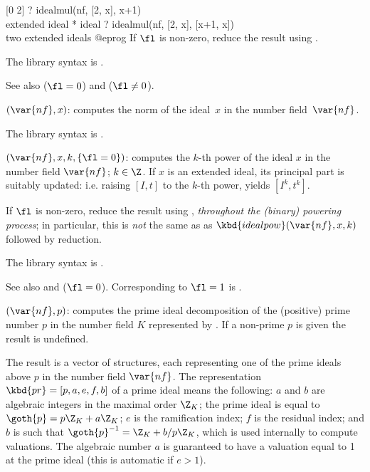 [0 2]
? idealmul(nf, [2, x], x+1)        \\ extended ideal * ideal
? idealmul(nf, [2, x], [x+1, x])   \\ two extended ideals
@eprog\noindent
If $\fl$ is non-zero, reduce the result using .

The library syntax is .

\noindent See also  ($\fl=0$) and 
($\fl\neq0$).

$(\var{nf},x)$: \label{se:idealnorm}computes the norm of the ideal~$x$ in the number field~$\var{nf}$.

The library syntax is .

$(\var{nf},x,k,\{\fl=0\})$: \label{se:idealpow}computes the $k$-th power of
the ideal $x$ in the number field $\var{nf}$; $k\in\Z$.
If $x$ is an extended
ideal, its principal part is suitably
updated: i.e. raising $[I,t]$ to the $k$-th power, yields $[I^k, t^k]$.

If $\fl$ is non-zero, reduce the result using , \emph{throughout
the (binary) powering process}; in particular, this is \emph{not} the same as
as $\kbd{idealpow}(\var{nf},x,k)$ followed by reduction.

The library syntax is .

\noindent See also
 and
 ($\fl = 0$).
Corresponding to $\fl=1$ is .

$(\var{nf},p)$: \label{se:idealprimedec}computes the prime ideal
decomposition of the (positive) prime number $p$ in the number field $K$
represented by . If a non-prime $p$ is given the result is undefined.

The result is a vector of  structures, each representing one of the
prime ideals above $p$ in the number field $\var{nf}$. The representation
$\kbd{pr}=[p,a,e,f,b]$ of a prime ideal means the following: $a$ and $b$ are
algebraic integers in the maximal order $\Z_K$; the prime ideal is
equal to $\goth{p} = p\Z_K + a\Z_K$;
$e$ is the ramification index; $f$ is the residual index;
and $b$ is such that $\goth{p}^{-1}=\Z_K+ b/ p\Z_K$, which is used internally
to compute valuations. The algebraic number $a$ is guaranteed to have a
valuation equal to 1 at the prime ideal (this is automatic if $e>1$).

